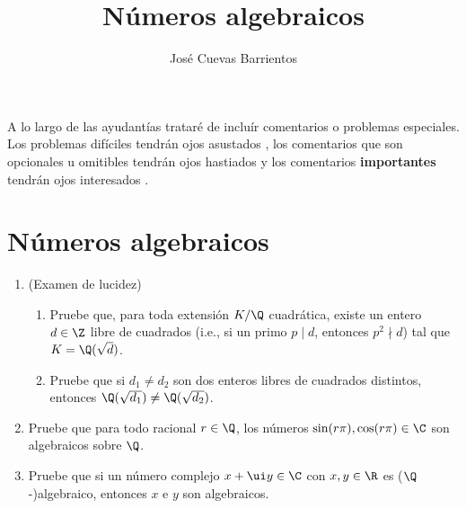\documentclass[11pt, reqno]{amsart}
\title{Números algebraicos}
\date{\DTMdate{2025-03-13}}
\author{José Cuevas Barrientos}
\begin{document}
\maketitle

A lo largo de las ayudantías trataré de incluír comentarios o problemas especiales.
Los problemas difíciles tendrán ojos asustados {\straighteyes},
los comentarios que son opcionales u omitibles tendrán ojos hastiados {\upeyes}
y los comentarios \textbf{importantes} tendrán ojos interesados {\righteyes}.

\section{Números algebraicos}
\begin{enumerate}
	\item (Examen de lucidez)
		\begin{enumerate}
			\item Pruebe que, para toda extensión $K/\Q$ cuadrática, existe un entero $d \in \Z$ libre de cuadrados
				(i.e., si un primo $p \mid d$, entonces $p^2 \nmid d$) tal que $K = \Q(\sqrt{d})$.
			\item Pruebe que si $d_1 \ne d_2$ son dos enteros libres de cuadrados distintos, entonces
				$\Q(\sqrt{d_1}) \ne \Q(\sqrt{d_2})$.
		\end{enumerate}

	\item Pruebe que para todo racional $r \in \Q$, los números $\sin(r\pi), \cos(r\pi) \in \C$ son algebraicos sobre $\Q$.

	\item Pruebe que si un número complejo $x + \ui y \in \C$ con $x, y \in \R$ es ($\Q$-)algebraico,
		entonces $x$ e $y$ son algebraicos.


\end{enumerate}
\end{document}
